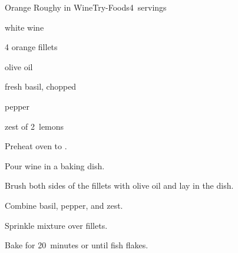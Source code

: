 \begin{recipe}{Orange Roughy in Wine}{Try-Foods}{4~servings}

\begin{ingredients}
\item \C{\quarter} white wine
\item 4  orange  fillets
\item {} olive oil
\item {} fresh basil, chopped
\item {} pepper
\item zest of 2~lemons
\end{ingredients}

\begin{directions}
\item Preheat oven to .
\item Pour wine in a baking dish.
\item Brush both sides of the fillets with olive oil and lay in the dish.
\item Combine basil, pepper, and zest.
\item Sprinkle mixture over fillets.
\item Bake for 20~minutes or until fish flakes.
\end{directions}

\end{recipe}
